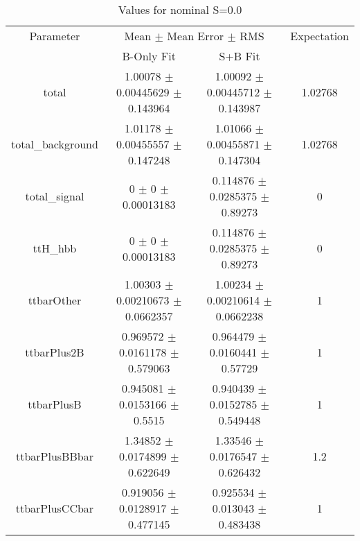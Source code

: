\begin{table}
\centering
\caption{Values for nominal S=0.0}
\begin{tabular}{cccc}
\toprule
Parameter & \multicolumn{2}{c}{Mean $\pm$ Mean Error $\pm$ RMS} & Expectation\\
 & B-Only Fit & S+B Fit & \\
\midrule
total & \num{1.00078} $\pm$ \num{0.00445629} $\pm$ \num{0.143964} & \num{1.00092} $\pm$ \num{0.00445712} $\pm$ \num{0.143987} & \num{1.02768}\\
total\_background & \num{1.01178} $\pm$ \num{0.00455557} $\pm$ \num{0.147248} & \num{1.01066} $\pm$ \num{0.00455871} $\pm$ \num{0.147304} & \num{1.02768}\\
total\_signal & \num{0} $\pm$ \num{0} $\pm$ \num{0.00013183} & \num{0.114876} $\pm$ \num{0.0285375} $\pm$ \num{0.89273} & \num{0}\\
ttH\_hbb & \num{0} $\pm$ \num{0} $\pm$ \num{0.00013183} & \num{0.114876} $\pm$ \num{0.0285375} $\pm$ \num{0.89273} & \num{0}\\
ttbarOther & \num{1.00303} $\pm$ \num{0.00210673} $\pm$ \num{0.0662357} & \num{1.00234} $\pm$ \num{0.00210614} $\pm$ \num{0.0662238} & \num{1}\\
ttbarPlus2B & \num{0.969572} $\pm$ \num{0.0161178} $\pm$ \num{0.579063} & \num{0.964479} $\pm$ \num{0.0160441} $\pm$ \num{0.57729} & \num{1}\\
ttbarPlusB & \num{0.945081} $\pm$ \num{0.0153166} $\pm$ \num{0.5515} & \num{0.940439} $\pm$ \num{0.0152785} $\pm$ \num{0.549448} & \num{1}\\
ttbarPlusBBbar & \num{1.34852} $\pm$ \num{0.0174899} $\pm$ \num{0.622649} & \num{1.33546} $\pm$ \num{0.0176547} $\pm$ \num{0.626432} & \num{1.2}\\
ttbarPlusCCbar & \num{0.919056} $\pm$ \num{0.0128917} $\pm$ \num{0.477145} & \num{0.925534} $\pm$ \num{0.013043} $\pm$ \num{0.483438} & \num{1}\\
\bottomrule
\end{tabular}
\end{table}